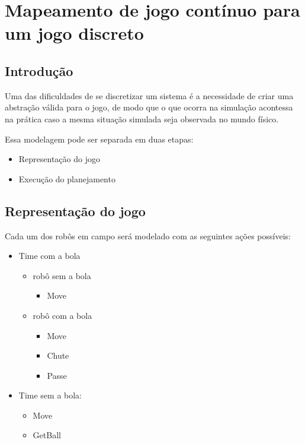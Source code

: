 \chapter{Mapeamento de jogo contínuo para um jogo discreto}\label{cap:mapeamento}

\section{Introdução}
Uma das dificuldades de se discretizar um sistema é a necessidade de criar uma abstração válida para
o jogo, de modo que o que ocorra na simulação acontessa na prática caso a mesma situação simulada
seja observada no mundo físico.

Essa modelagem pode ser separada em duas etapas:

\begin{itemize}
  \item Representação do jogo
  \item Execução do planejamento
\end{itemize}

\section{Representação do jogo}

Cada um dos robôs em campo será modelado com as seguintes ações possíveis:
\begin{itemize}
  \item Time com a bola
  \begin{itemize}
    \item robô sem a bola
    \begin{itemize}
       \item Move
    \end{itemize}
    \item robô com a bola
    \begin{itemize}
       \item Move
       \item Chute
       \item Passe
    \end{itemize}
  \end{itemize}
  \item Time sem a bola:
  \begin{itemize}
    \item Move
    \item GetBall
  \end{itemize}
\end{itemize}

